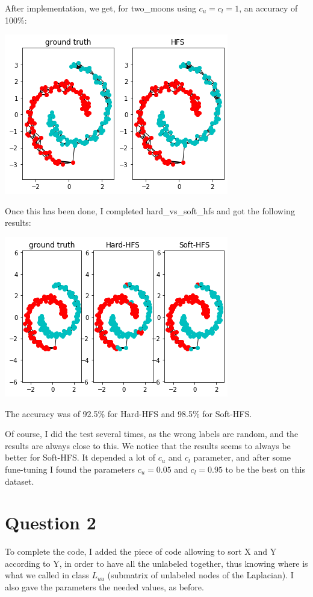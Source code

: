 \documentclass{article}
\begin{document}
After implementation, we get, for two\_moons using $c_u = c_l = 1$, an accuracy of 100\%:
\begin{center}
	\includegraphics[scale=0.7]{3}
\end{center}


Once this has been done, I completed hard\_vs\_soft\_hfs and got the following results:
\begin{center}
	\includegraphics[scale=0.7]{4}
\end{center}
The accuracy was of 92.5\% for Hard-HFS and 98.5\% for Soft-HFS.

Of course, I did the test several times, as the wrong labels are random, and the results are always close to this. We notice that the results seems to always be better for Soft-HFS. It depended a lot of $c_u$ and $c_l$ parameter, and after some fune-tuning I found the parameters $c_u=0.05$ and $c_l=0.95$ to be the best on this dataset. 

\section{Question 2}


To complete the code, I added the piece of code allowing to sort X and Y according to Y, in order to have all the unlabeled together, thus knowing where is what we called in class $L_{uu}$ (submatrix of unlabeled nodes of the Laplacian). I also gave the parameters the needed values, as before.
\end{document}
